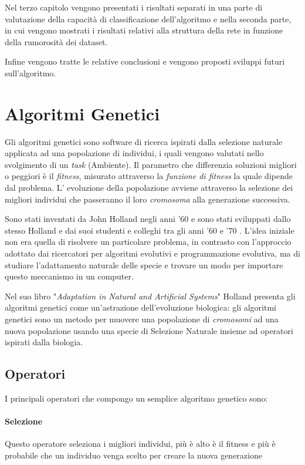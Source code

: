 \documentclass[12pt,a4paper]{report}
\begin{document}
Nel terzo capitolo vengono presentati i risultati separati in una parte di valutazione della capacità di classificazione dell'algoritmo e nella seconda parte, in cui vengono mostrati i risultati relativi alla struttura della rete in funzione della rumorosità dei dataset. 

Infine vengono tratte le relative conclusioni e vengono proposti sviluppi futuri sull'algoritmo.

\section{Algoritmi Genetici}\label{alg-gen} 

Gli algoritmi genetici sono software di ricerca ispirati dalla selezione naturale applicata ad una popolazione di individui, i quali vengono valutati nello svolgimento di un \textit{task} (Ambiente).
Il parametro che differenzia soluzioni migliori o peggiori è il \textit{fitness}, misurato attraverso la \textit{funzione di fitness} la quale dipende dal problema.
L' evoluzione della popolazione avviene attraverso la selezione dei migliori individui che passeranno il loro \textit{cromosoma} alla generazione successiva.

Sono stati inventati da John Holland negli anni '60 e sono stati sviluppati dallo stesso Holland e dai suoi studenti e colleghi tra gli anni '60 e '70 \cite{genetic-algorithm-mitchell}.
L'idea iniziale non era quella di risolvere un particolare problema, in contrasto con l'approccio adottato dai ricercatori per algoritmi evolutivi e programmazione evolutiva, ma di studiare l'adattamento naturale delle specie e trovare un modo per importare questo meccanismo in un computer.

Nel suo libro "\textit{Adaptation in Natural and Artificial Systems}" Holland presenta gli algoritmi genetici come un'astrazione dell'evoluzione biologica: gli algoritmi genetici sono un metodo per muovere una popolazione di \textit{cromosomi} ad una nuova popolazione usando una specie di Selezione Naturale insieme ad operatori ispirati dalla biologia.
         
\subsection{Operatori}

I principali operatori che compongo un semplice algoritmo genetico sono\cite{genetic-algorithm-mitchell}:

\paragraph{Selezione} Questo operatore seleziona i migliori individui, più è alto è il fitness e più è probabile che un individuo venga scelto per creare la nuova generazione
\end{document}
